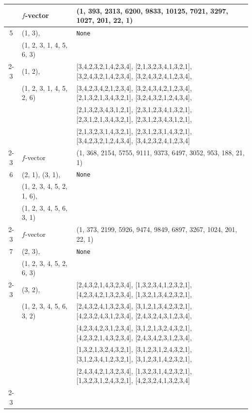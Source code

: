 \documentclass[10pt]{amsart}
\numberwithin{equation}{section}
\theoremstyle{plain}
\theoremstyle{definition}
\theoremstyle{remark}
\begin{document}
{\begin{longtable}{c|l|l}
		& $f$-vector & {(1, 393, 2313, 6200, 9833, 10125, 7021, 3297, 1027, 201, 22, 1)} \\
		\midrule
		
		5 & (1, 3), & \texttt{None} \\
		& (1, 2, 3, 1, 4, 5, 6, 3) &  \\ \cline{2-3}
		
		& (1, 2), & [3,4,2,3,2,1,4,2,3,4], [2,1,3,2,3,4,1,3,2,1], [3,2,4,3,2,1,4,2,3,4], [3,2,4,3,2,4,1,2,3,4], \\
		& (1, 2, 3, 1, 4, 5, 2, 6) & [3,4,2,3,4,2,1,2,3,4], [3,2,4,3,4,2,1,2,3,4], [2,1,3,2,1,3,4,3,2,1], [3,2,4,3,2,1,2,4,3,4], \\
		&  & [2,1,3,2,3,4,3,1,2,1], [2,3,1,2,3,4,1,3,2,1], [2,3,1,2,1,3,4,3,2,1], [2,3,1,2,3,4,3,1,2,1], \\
		&  & [2,1,3,2,3,1,4,3,2,1], [2,3,1,2,3,1,4,3,2,1], [3,4,2,3,2,1,2,4,3,4], [3,4,2,3,2,4,1,2,3,4] \\ \cline{2-3}
		
		& $f$-vector & {(1, 368, 2154, 5755, 9111, 9373, 6497, 3052, 953, 188, 21, 1)} \\
		\midrule
		
		6 & (2, 1), (3, 1), & \texttt{None} \\
		& (1, 2, 3, 4, 5, 2, 1, 6), &  \\
		& (1, 2, 3, 4, 5, 6, 3, 1) &  \\ \cline{2-3}
		
		& $f$-vector & {(1, 373, 2199, 5926, 9474, 9849, 6897, 3267, 1024, 201, 22, 1)} \\
		\midrule
		
		7 & (2, 3), & \texttt{None} \\
		& (1, 2, 3, 4, 5, 2, 6, 3) &  \\ \cline{2-3}
		
		& (3, 2), & [2,4,3,2,1,4,3,2,3,4], [1,3,2,3,4,1,2,3,2,1], [4,2,3,4,2,1,3,2,3,4], [1,3,2,1,3,4,2,3,2,1], \\
		& (1, 2, 3, 4, 5, 6, 3, 2) & [2,4,3,2,4,1,3,2,3,4], [3,1,2,1,3,4,2,3,2,1], [4,2,3,2,4,3,1,2,3,4], [2,4,3,2,4,3,1,2,3,4], \\
		&  & [4,2,3,4,2,3,1,2,3,4], [3,1,2,1,3,2,4,3,2,1], [4,2,3,2,1,4,3,2,3,4], [2,4,3,4,2,3,1,2,3,4], \\
		&  & [1,3,2,1,3,2,4,3,2,1], [3,1,2,3,1,2,4,3,2,1], [3,1,2,3,4,1,2,3,2,1], [3,1,2,3,1,4,2,3,2,1], \\
		&  & [2,4,3,4,2,1,3,2,3,4], [1,3,2,3,1,4,2,3,2,1], [1,3,2,3,1,2,4,3,2,1], [4,2,3,2,4,1,3,2,3,4] \\ \cline{2-3}
		

\end{longtable}}
\end{document}
